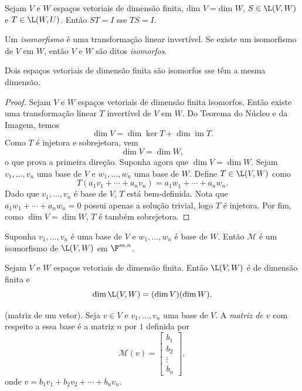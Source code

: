 \documentclass{article}
\DeclareMathOperator{\im}{im}
\begin{document}
\begin{prop}
    Sejam \(V\) e \(W\) espaços vetoriais de dimensão finita, \(\text{dim } V = \text{dim } W\), \(S \in \L(V, W)\) e \(T \in \L(W, U)\). Então \(ST = I\) sse \(TS = I\).
\end{prop}

\begin{defn}
    Um \emph{isomorfismo} é uma transformação linear invertível. Se existe um isomorfismo de \(V\) em \(W\), então \(V\) e \(W\) são ditos \emph{isomorfos}.
\end{defn}

\begin{prop}
    Dois espaços vetoriais de dimensão finita são isomorfos sse têm a mesma dimensão.
\end{prop}

\begin{proof}
    Sejam \(V\) e \(W\) espaços vetoriais de dimensão finita isomorfos. Então existe uma transformação linear \(T\) invertível de \(V\) em \(W\). Do Teorema do Núcleo e da Imagem, temos 
    \[
        \dim V = \dim \ker T + \dim \im T.
    \]
    Como \(T\) é injetora e sobrejetora, vem
    \[
        \dim V = \dim W,
    \]
    \noindent o que prova a primeira direção. Suponha agora que \(\dim V = \dim W\). Sejam \(v_1, \ldots, v_n\) uma base de \(V\) e \(w_1, \ldots, w_n\) uma base de \(W\). Define \(T \in \L(V, W)\) como 
    \[
        T(a_1 v_1 + \cdots + a_n v_n) = a_1 w_1 + \cdots + a_n w_n.
    \]
    Dado que \(v_1, \ldots, v_n\) é base de \(V\), \(T\) está bem-definida. Nota que \(a_1 w_1 + \cdots + a_n w_n = 0\) possui apenas a solução trivial, logo \(T\) é injetora. Por fim, como \(\dim V = \dim W\), \(T\) é também sobrejetora.
\end{proof}

\begin{prop}
    Suponha \(v_1, \ldots, v_n\) é uma base de \(V\) e \(w_1, \ldots, w_n\) é base de \(W\). Então \(\mathcal{M}\) é um isomorfismo de \(\L(V, W)\) em \(\F^{m,n}\).
\end{prop}

\begin{cor}
    Sejam \(V\) e \(W\) espaços vetoriais de dimensão finita. Então \(\L(V, W)\) é de dimensão finita e
    \[
        \dim \L(V, W) = (\dim V)(\dim W).
    \]
\end{cor}

\begin{defn} (matriz de um vetor).
    Seja \(v \in V\) e \(v_1,\ldots,v_n\) uma base de \(V\). A \emph{matriz de \(v\)} com respeito a essa base é a matriz \(n\) por \(1\) definida por
    \[
        \mathcal{M}(v) = \begin{bmatrix}
            b_1 \\
            b_2 \\
            \vdots \\
            b_n
        \end{bmatrix},
    \]
    \noindent onde \(v = b_1 v_1 + b_2 v_2 + \cdots + b_n v_n\).
\end{defn}
\end{document}
